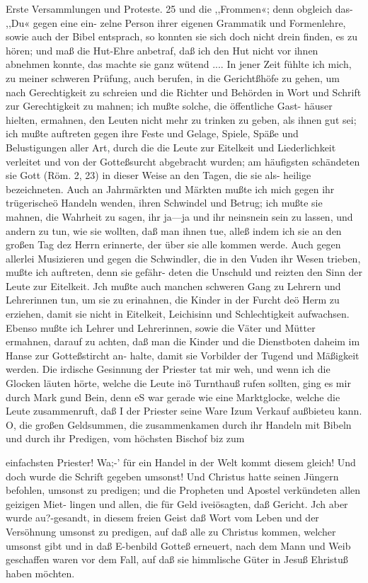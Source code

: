 Erste Versammlungen und Proteste. 25
und die ,,Frommen«; denn obgleich das- ,,Du« gegen eine ein-
zelne Person ihrer eigenen Grammatik und Formenlehre, sowie
auch der Bibel entsprach, so konnten sie sich doch nicht drein
finden, es zu hören; und maß die Hut-Ehre anbetraf, daß ich
den Hut nicht vor ihnen abnehmen konnte, das machte sie ganz
wütend ....
In jener Zeit fühlte ich mich, zu meiner schweren Prüfung,
auch berufen, in die Gerichtßhöfe zu gehen, um nach Gerechtigkeit
zu schreien und die Richter und Behörden in Wort und Schrift
zur Gerechtigkeit zu mahnen; ich mußte solche, die öffentliche Gast-
häuser hielten, ermahnen, den Leuten nicht mehr zu trinken zu
geben, als ihnen gut sei; ich mußte auftreten gegen ihre Feste
und Gelage, Spiele, Späße und Belustigungen aller Art, durch
die die Leute zur Eitelkeit und Liederlichkeit verleitet und von
der Gotteßsurcht abgebracht wurden; am häufigsten schändeten
sie Gott (Röm. 2, 23) in dieser Weise an den Tagen, die sie als-
heilige bezeichneten. Auch an Jahrmärkten und Märkten mußte
ich mich gegen ihr trügerischeö Handeln wenden, ihren Schwindel
und Betrug; ich mußte sie mahnen, die Wahrheit zu sagen, ihr
ja—ja und ihr neinsnein sein zu lassen, und andern zu tun, wie
sie wollten, daß man ihnen tue, alleß indem ich sie an den großen
Tag dez Herrn erinnerte, der über sie alle kommen werde. Auch
gegen allerlei Musizieren und gegen die Schwindler, die in den
Vuden ihr Wesen trieben, mußte ich auftreten, denn sie gefähr-
deten die Unschuld und reizten den Sinn der Leute zur Eitelkeit.
Jch mußte auch manchen schweren Gang zu Lehrern und Lehrerinnen
tun, um sie zu erinahnen, die Kinder in der Furcht deö Herm zu
erziehen, damit sie nicht in Eitelkeit, Leichisinn und Schlechtigkeit
aufwachsen. Ebenso mußte ich Lehrer und Lehrerinnen, sowie die
Väter und Mütter ermahnen, darauf zu achten, daß man die
Kinder und die Dienstboten daheim im Hanse zur Gotteßstircht an-
halte, damit sie Vorbilder der Tugend und Mäßigkeit werden.
Die irdische Gesinnung der Priester tat mir weh, und wenn
ich die Glocken läuten hörte, welche die Leute inö Turnthauß
rufen sollten, ging es mir durch Mark gund Bein, denn eS war
gerade wie eine Marktglocke, welche die Leute zusammenruft, daß I
der Priester seine Ware Izum Verkauf außbieteu kann. O, die
großen Geldsummen, die zusammenkamen durch ihr Handeln mit
Bibeln und durch ihr Predigen, vom höchsten Bischof biz zum


einfachsten Priester! Wa;-’ für ein Handel in der Welt kommt
diesem gleich! Und doch wurde die Schrift gegeben umsonst! Und
Christus hatte seinen Jüngern befohlen, umsonst zu predigen;
und die Propheten und Apostel verkündeten allen geizigen Miet-
lingen und allen, die für Geld iveiösagten, daß Gericht. Jch
aber wurde au?-gesandt, in diesem freien Geist daß Wort vom
Leben und der Versöhnung umsonst zu predigen, auf daß alle zu
Christus kommen, welcher umsonst gibt und in daß E-benbild
Gotteß erneuert, nach dem Mann und Weib geschaffen waren
vor dem Fall, auf daß sie himmlische Güter in Jesuß Ehristuß
haben möchten.

